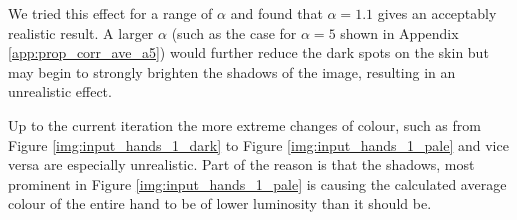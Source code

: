 We tried this effect for a range of $\alpha$ and found that $\alpha = 1.1$ gives an acceptably realistic result. A larger $\alpha$ (such as the case for $\alpha = 5$ shown in Appendix \ref{app:prop_corr_ave_a5}) would further reduce the dark spots on the skin but may begin to strongly brighten the shadows of the image, resulting in an unrealistic effect.

Up to the current iteration the more extreme changes of colour, such as from Figure \ref{img:input_hands_1_dark} to Figure \ref{img:input_hands_1_pale} and vice versa are especially unrealistic. Part of the reason is that the shadows, most prominent in Figure \ref{img:input_hands_1_pale} is causing the calculated average colour of the entire hand to be of lower luminosity than it should be. 